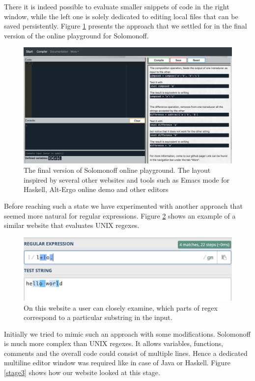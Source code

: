There it is indeed possible to evaluate smaller snippets of code in the right window, while the left one is solely dedicated to editing local files that can be saved persistently. Figure \ref{final} presents the approach that we settled for in the final version of the online playground for Solomonoff.
\begin{figure}
\centering
\includegraphics[scale=0.3]{web8.png}
\caption{The final version of Solomonoff online playground. The layout inspired by several other websites and tools such as Emacs mode for Haskell, Alt-Ergo online demo and other editors}
\label{final}
\end{figure}
Before reaching such a state we have experimented with another approach that seemed more natural for regular expressions. Figure \ref{regex} shows an example of a similar website that evaluates UNIX regexes.
\begin{figure}
\centering
\includegraphics[scale=0.65]{regex.png}
\caption{On this website a user can closely examine, which parts of regex correspond to a particular substring in the input.}
\label{regex}
\end{figure}
Initially we tried to mimic such an approach with some modifications. Solomonoff is much more complex than UNIX regexes. It allows variables, functions, comments and the overall code could consist of multiple lines. Hence a dedicated multiline editor window was required like in case of Java or Haskell. Figure \ref{stage3} shows how our website looked at this stage.
